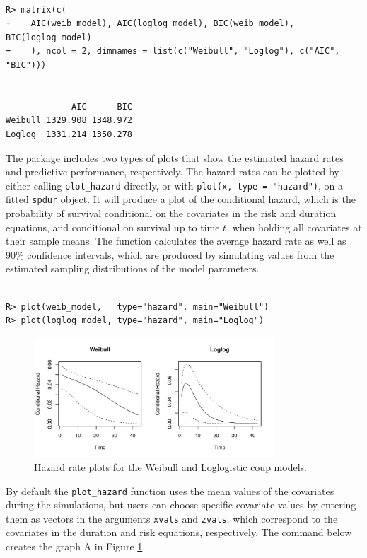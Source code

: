 \documentclass[12pt,onesided]{amsart}
\begin{document}
\begin{lstlisting}

R> matrix(c(
+    AIC(weib_model), AIC(loglog_model), BIC(weib_model), BIC(loglog_model)
+    ), ncol = 2, dimnames = list(c("Weibull", "Loglog"), c("AIC", "BIC")))


             AIC      BIC
Weibull 1329.908 1348.972
Loglog  1331.214 1350.278

\end{lstlisting}

The package includes two types of plots that show the estimated hazard rates and 
predictive performance, respectively. The hazard rates can be plotted by either 
calling \verb|plot_hazard| directly, or with \texttt{plot(x, type = "hazard")}, on
a fitted \texttt{spdur} object. It will produce a plot of the conditional hazard, which is the probability of survival conditional on the covariates in the risk and
duration equations, and conditional on survival up to time \(t\), when holding
all covariates at their sample means. The
function calculates the average hazard rate as well as 90\% confidence
intervals, which are produced by simulating values from the estimated
sampling distributions of the model parameters. 

\begin{lstlisting}

R> plot(weib_model,   type="hazard", main="Weibull")
R> plot(loglog_model, type="hazard", main="Loglog")

\end{lstlisting}

\begin{figure}
\begin{center}
\includegraphics[width=0.8\textwidth]{graphics/hazard-rates.pdf}
\caption{Hazard rate plots for the Weibull and Loglogistic coup models.}
\label{hazard-ex}
\end{center}
\end{figure}

By default the \verb|plot_hazard| function
uses the mean values of the covariates during the simulations, but users
can choose specific covariate values by entering them as vectors in the
arguments \texttt{xvals} and \texttt{zvals}, which correspond to the
covariates in the duration and risk equations, respectively. The command
below creates the graph A in Figure \ref{hazard-ex}.
\end{document}

